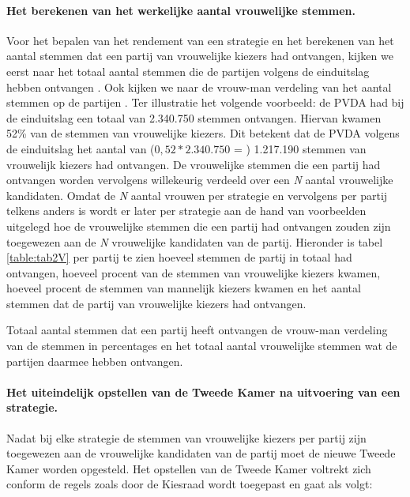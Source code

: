 \newpage
\paragraph{Het berekenen van het werkelijke aantal vrouwelijke stemmen.}
Voor het bepalen van het rendement van een strategie en het berekenen van het aantal stemmen dat een partij van vrouwelijke kiezers had ontvangen, kijken we eerst naar het totaal aantal stemmen die de partijen volgens de einduitslag hebben ontvangen \citep{Kiesraad_uitslag}. Ook kijken we naar de vrouw-man verdeling van het aantal stemmen op de partijen \citep{IPSOS_man_vrouw}. Ter illustratie het volgende voorbeeld: de PVDA had bij de einduitslag een totaal van 2.340.750 stemmen ontvangen. Hiervan kwamen 52\% van de stemmen van vrouwelijke kiezers. Dit betekent dat de PVDA volgens de einduitslag het aantal van ($0,52*2.340.750$ = ) 1.217.190 stemmen van vrouwelijk kiezers had ontvangen. De vrouwelijke stemmen die een partij had ontvangen worden vervolgens willekeurig verdeeld over een \textit{N} aantal vrouwelijke kandidaten. Omdat de \textit{N} aantal vrouwen per strategie en vervolgens per partij telkens anders is wordt er later per strategie aan de hand van voorbeelden uitgelegd hoe de vrouwelijke stemmen die een partij had ontvangen zouden zijn toegewezen aan de \textit{N} vrouwelijke kandidaten van de partij. Hieronder is tabel \ref{table:tab2V} per partij te zien hoeveel stemmen de partij in totaal had ontvangen, hoeveel procent van de stemmen van vrouwelijke kiezers kwamen, hoeveel procent de stemmen van mannelijk kiezers kwamen en het aantal stemmen dat de partij van vrouwelijke kiezers had ontvangen. 


\begin{table}[h]
\centering
	\begin{footnotesize}
		
	\end{footnotesize}

			\caption{Totaal aantal stemmen dat een partij heeft ontvangen \citep{Kiesraad_databank} de vrouw-man verdeling van de stemmen in percentages \citep{IPSOS_man_vrouw} en het totaal aantal vrouwelijke stemmen wat de partijen daarmee hebben ontvangen.}
\label{table:tab2V} 
\end{table}




\paragraph{Het uiteindelijk opstellen van de Tweede Kamer na uitvoering van een strategie.} \label{opstellen}
Nadat bij elke strategie de stemmen van vrouwelijke kiezers per partij zijn toegewezen aan de vrouwelijke kandidaten van de partij moet de nieuwe Tweede Kamer worden opgesteld. Het opstellen van de Tweede Kamer voltrekt zich conform de regels
zoals door de Kiesraad \citeyearpar{Kiesraad_voorkeursdrempel2} wordt toegepast
en gaat als volgt: 


